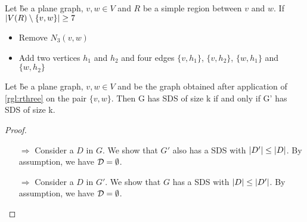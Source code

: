 %
%
%
%
%
%
%
%
%
\begin{rgl}\label{rgl:rthree}
    Let \G be a plane graph, $v, w \in V$ and $R$ be a simple region between $v$ and $w$. If $\abs{V(R) \setminus \{v, w\}} \geq 7$
    \begin{itemize}
        \item Remove $N_3(v,w)$
        \item Add two vertices $h_1$ and $h_2$ and four edges $\{v, h_1\}$, $\{v, h_2\}$, $\{w, h_1\}$ and $\{w, h_2\}$
    \end{itemize}
\end{rgl}
\begin{lemma}\label{lemma:correctnessthree}
    Let \G be a plane graph, $v, w \in V$ and \GB be the graph obtained after application of \cref{rgl:rthree} on the pair $\{v, w\}$. Then G has SDS of size k if and only if G' has SDS of size k.
\end{lemma}
\begin{proof}
    \begin{enumerate}
        \item[$\Rightarrow$] Consider a \sdom $D$ in $G$. We show that $G'$ also has a SDS with $\abs{D'} \leq \abs{D}$. By assumption, we have $\mathcal{D} = \emptyset$.
        \item[$\Rightarrow$] Consider a \sdom $D$ in $G'$. We show that $G$ has a SDS with $\abs{D} \leq \abs{D'}$. By assumption, we have $\mathcal{D} = \emptyset$.

    \end{enumerate}
 
\end{proof}

